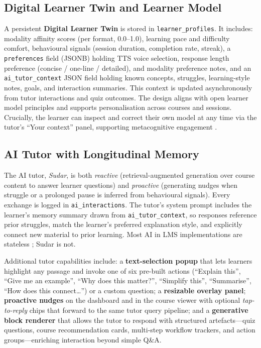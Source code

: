 \documentclass[10pt,twocolumn]{article}
\begin{document}
\subsection{Digital Learner Twin and Learner Model}
\label{sec:twin}

A persistent \textbf{Digital Learner Twin} is stored in
\texttt{learner\_profiles}. It includes: modality affinity scores
(per format, 0.0--1.0), learning pace and difficulty comfort,
behavioural signals (session duration, completion rate, streak), a
\texttt{preferences} field (JSONB) holding TTS voice selection,
response length preference (concise / one-line / detailed), and
modality preference notes, and an \texttt{ai\_tutor\_context} JSON
field holding known concepts, struggles, learning-style notes, goals,
and interaction summaries. This context is updated asynchronously from
tutor interactions and quiz outcomes. The design aligns with open
learner model principles \cite{bull2016} and supports personalisation
across courses and sessions. Crucially, the learner can inspect and
correct their own model at any time via the tutor's ``Your context''
panel, supporting metacognitive engagement \cite{zimmerman2002}.

\subsection{AI Tutor with Longitudinal Memory}
\label{sec:tutor}

The AI tutor, \textit{Sudar}, is both \emph{reactive}
(retrieval-augmented generation over course content to answer learner
questions) and \emph{proactive} (generating nudges when struggle or a
prolonged pause is inferred from behavioural signals). Every exchange
is logged in \texttt{ai\_interactions}. The tutor's system prompt
includes the learner's memory summary drawn from
\texttt{ai\_tutor\_context}, so responses reference prior struggles,
match the learner's preferred explanation style, and explicitly connect
new material to prior learning. Most AI in LMS implementations are
stateless \cite{zawacki2019}; Sudar is not.

Additional tutor capabilities include: a \textbf{text-selection
popup} that lets learners highlight any passage and invoke one of six
pre-built actions (``Explain this'', ``Give me an example'', ``Why
does this matter?'', ``Simplify this'', ``Summarise'', ``How does this
connect\ldots'') or a custom question; a \textbf{resizable overlay
panel}; \textbf{proactive nudges} on the dashboard and in the course
viewer with optional \emph{tap-to-reply} chips that forward to the same
tutor query pipeline; and a \textbf{generative block renderer} that allows the tutor
to respond with structured artefacts---quiz questions, course
recommendation cards, multi-step workflow trackers, and action
groups---enriching interaction beyond simple Q\&A.
\end{document}
